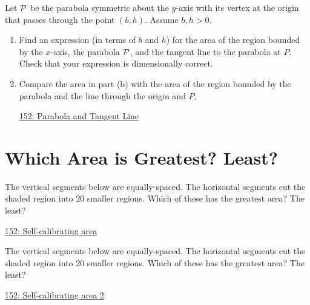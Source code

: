\documentclass{ximera}
\begin{document}
\begin{question} \label{Q88w4448ewe}
Let ${\cal P}$ be the parabola symmetric about the $y$-axis with its vertex at the origin that passes through the point $(b,h)$. Assume $b,h>0$.

\begin{enumerate}

\item Find an expression (in terms of $b$ and $h$) for the area of the region bounded by the $x$-axis, the parabola ${\cal P}$, and the tangent line to the parabola at $P$. Check that your expression is dimensionally correct.

\item Compare the area in part (b) with the area of the region bounded by the parabola and the line through the origin and $P$.

\begin{onlineOnly}
    \begin{center}
\end{center}
\end{onlineOnly}

\href{https://www.desmos.com/calculator/3ulhw9wx4w}{152: Parabola and Tangent Line}

\end{enumerate}
\end{question}


\section{Which Area is Greatest? Least?}

\begin{question} \label{QPlerredd}

The vertical segments below are equally-spaced. The horizontal segments cut the shaded region into $20$ smaller regions. Which of these has the greatest area? The least?

\begin{onlineOnly}
    \begin{center}
\end{center}
\end{onlineOnly}

\href{https://www.desmos.com/calculator/wsgteg55ta}{152: Self-calibrating area}
\end{question}

\begin{question} \label{QPldfefdfsdfd}

The vertical segments below are equally-spaced. The horizontal segments cut the shaded region into $20$ smaller regions. Which of these has the greatest area? The least?

\begin{onlineOnly}
    \begin{center}
\end{center}
\end{onlineOnly}

\href{https://www.desmos.com/calculator/dir9hpzvse}{152: Self-calibrating area 2}
\end{question}
\end{document}
